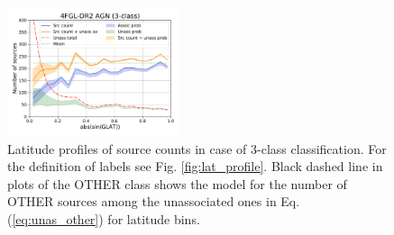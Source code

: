 \begin{figure}[h]
\includegraphics[width=0.45\textwidth]{plots/lat_profile_AGN_4FGL-DR2_3classes.pdf}
\caption{Latitude profiles of source counts in case of 3-class classification. For the definition of labels see Fig. \ref{fig:lat_profile}.
Black dashed line in plots of the OTHER class shows the model for the number of OTHER sources among the unassociated ones
in Eq. (\ref{eq:unas_other}) for latitude bins.}
\label{fig:lat_profile_3class}
\end{figure}



